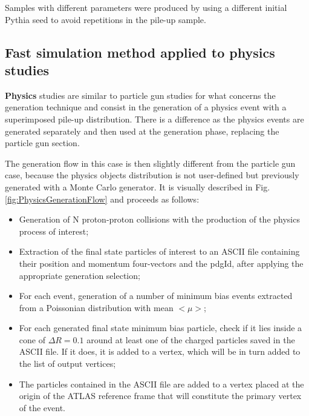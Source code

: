 \documentclass[a4paper,twoside,12pt]{article}
\begin{document}
Samples with different parameters were produced by using a different initial Pythia seed to 
avoid repetitions in the pile-up sample. \\

\subsection{Fast simulation method applied to physics studies}\label{sec:simulation:physicsSimulation}

\textbf{Physics} studies are similar to particle gun studies for what concerns the generation technique and 
consist in the generation of a physics event with a superimposed pile-up distribution. There is a difference as
the physics events are generated separately and then used at the generation phase, replacing the particle gun
section.\\

The generation flow in this case is then slightly different from the particle gun case, because 
the physics objects distribution is not user-defined but previously generated with a Monte
Carlo generator. It is visually described in Fig.\ref{fig:PhysicsGenerationFlow} and proceeds as follows:\\

\begin{itemize}
\item Generation of N proton-proton collisions with the production of the physics process of
interest;
\item Extraction of the final state particles of interest to an ASCII file containing their
position and momentum four-vectors and the pdgId, after applying the appropriate generation selection;
\item For each event, generation of a number of minimum bias events extracted from a Poissonian distribution with mean $<\mu>$;
\item For each generated final state minimum bias particle, check if it lies inside a cone of 
$\Delta R = 0.1$ around at least one of the charged particles saved in the ASCII file. If it does,
it is added to a vertex, which will be in turn added to the list of output vertices;
\item The particles contained in the ASCII file are added to a vertex placed at the origin
of the ATLAS reference frame that will constitute the primary vertex of the event.

\end{itemize}
\end{document}
